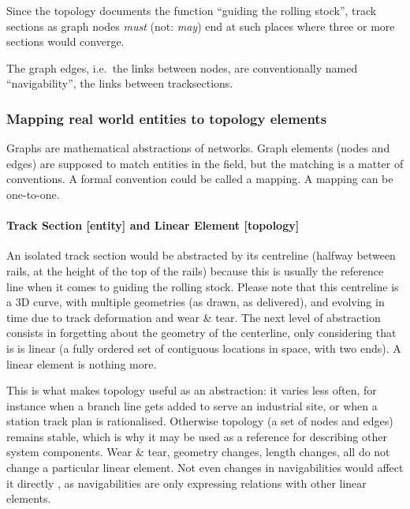 \documentclass[
  11pt,
]{article}
\begin{document}
Since the topology documents the function ``guiding the rolling stock'',
track sections as graph nodes \emph{must} (not: \emph{may}) end at such
places where three or more sections would converge.

The graph edges, i.e.~the links between nodes, are conventionally named
``navigability'', the links between tracksections.

\hypertarget{mapping-real-world-entities-to-topology-elements}{%
\subsubsection{Mapping real world entities to topology
elements}\label{mapping-real-world-entities-to-topology-elements}}

Graphs are mathematical abstractions of networks. Graph elements (nodes
and edges) are supposed to match entities in the field, but the matching
is a matter of conventions. A formal convention could be called a
mapping. A mapping can be one-to-one.

\hypertarget{track-section-entity-and-linear-element-topology}{%
\paragraph{Track Section {[}entity{]} and Linear Element
{[}topology{]}}\label{track-section-entity-and-linear-element-topology}}

An isolated track section would be abstracted by its centreline (halfway
between rails, at the height of the top of the rails) because this is
usually the reference line when it comes to guiding the rolling stock.
Please note that this centreline is a 3D curve, with multiple geometries
(as drawn, as delivered), and evolving in time due to track deformation
and wear \& tear. The next level of abstraction consists in forgetting
about the geometry of the centerline, only considering that is is linear
(a fully ordered set of contiguous locations in space, with two ends). A
linear element is nothing more.

This is what makes topology useful as an abstraction: it varies less
often, for instance when a branch line gets added to serve an industrial
site, or when a station track plan is rationalised. Otherwise topology
(a set of nodes and edges) remains stable, which is why it may be used
as a reference for describing other system components. Wear \& tear,
geometry changes, length changes, all do not change a particular linear
element. Not even changes in navigabilities would affect it directly ,
as navigabilities are only expressing relations with other linear
elements.
\end{document}
